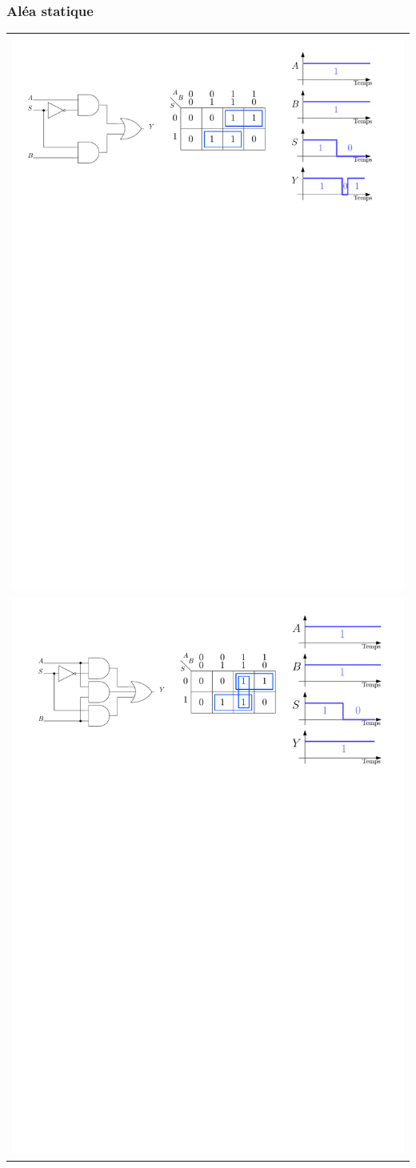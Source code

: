 \documentclass{beamer}
\begin{document}
\begin{frame}
\frametitle{Aléa statique}

\centering\begin{tabular}{c}
\includegraphics[width=0.7\linewidth]{Figs/and_2e_mux1.pdf}\\
\includegraphics[width=0.7\linewidth]{Figs/and_2e_mux2.pdf}
\end{tabular}

\end{frame}
\end{document}
